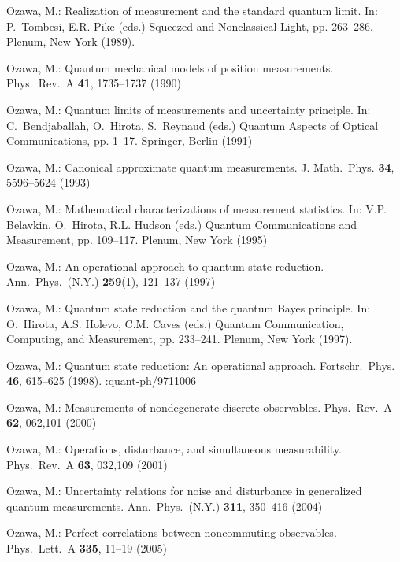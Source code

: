 \documentclass[graybox]{svmult}
\begin{document}
\begin{thebibliography}{10}
Ozawa, M.: Realization of measurement and the standard quantum limit.
\newblock In: P.~Tombesi, E.R. Pike (eds.) Squeezed and Nonclassical Light, pp.
  263--286. Plenum, New York (1989).

Ozawa, M.: Quantum mechanical models of position measurements.
\newblock Phys.\ Rev.\ A \textbf{{41}}, 1735--1737 (1990)

Ozawa, M.: Quantum limits of measurements and uncertainty principle.
\newblock In: C.~Bendjaballah, O.~Hirota, S.~Reynaud (eds.) Quantum Aspects of
  Optical Communications, pp. 1--17. Springer, Berlin (1991)

Ozawa, M.: Canonical approximate quantum measurements.
\newblock J. Math.\ Phys. \textbf{{34}}, 5596--5624 (1993)

Ozawa, M.: Mathematical characterizations of measurement statistics.
\newblock In: V.P. Belavkin, O.~Hirota, R.L. Hudson (eds.) Quantum
  Communications and Measurement, pp. 109--117. Plenum, New York (1995)

Ozawa, M.: An operational approach to quantum state reduction.
\newblock Ann.\ Phys.\ (N.Y.) \textbf{{259}}(1), 121--137 (1997)

Ozawa, M.: Quantum state reduction and the quantum {Bayes} principle.
\newblock In: O.~Hirota, A.S. Holevo, C.M. Caves (eds.) Quantum Communication,
  Computing, and Measurement, pp. 233--241. Plenum, New York (1997).

Ozawa, M.: Quantum state reduction: {An} operational approach.
\newblock Fortschr.\ Phys. \textbf{{46}}, 615--625 (1998).
:quant-ph/9711006

Ozawa, M.: Measurements of nondegenerate discrete observables.
\newblock Phys.\ Rev.\ A \textbf{{62}}, 062,101 (2000)

Ozawa, M.: Operations, disturbance, and simultaneous measurability.
\newblock Phys.\ Rev.\ A \textbf{{63}}, 032,109 (2001)

Ozawa, M.: Uncertainty relations for noise and disturbance in generalized
  quantum measurements.
\newblock Ann.\ Phys.\ (N.Y.) \textbf{311}, 350--416 (2004)

Ozawa, M.: Perfect correlations between noncommuting observables.
\newblock Phys.\ Lett.\ A \textbf{335}, 11--19 (2005)


\end{thebibliography}
\end{document}
